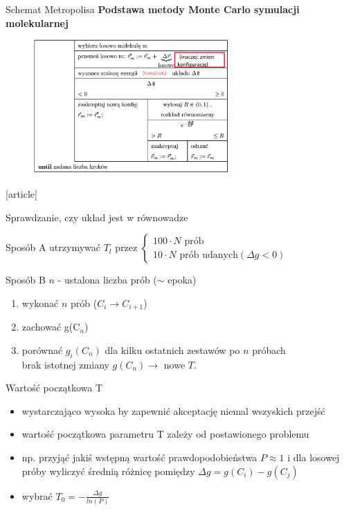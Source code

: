 	\begin{frame}{Schemat Metropolisa}
		\textbf{Podstawa metody Monte Carlo symulacji molekularnej}
		\begin{figure}
			\includegraphics[width=0.67\textwidth]{img/18/metropolis1}
		\end{figure}
		\begin{thebibliography}{9}
		\end{thebibliography}
	\end{frame}
		\begin{frame}{Sprawdzanie, czy układ jest w równowadze}
		\begin{block}{Sposób A}
			utrzymywać $T_l$ przez $\begin{cases}
			100 \cdot N \text{ prób} \\
			10 \cdot N \text{ prób udanych} (\Delta g < 0)
			\end{cases}$
		\end{block}
		
		\begin{block}{Sposób B}
		$n$ - ustalona liczba prób ($\sim$ epoka)
		\begin{enumerate}
			\item wykonać $n$ prób ($C_i \rightarrow C_{i+1}$)
			\item zachować g(C$_n$)
			\item porównać $g_i(C_n)$ dla kilku ostatnich zestawów po $n$ próbach \\
			brak istotnej zmiany $g(C_n) \rightarrow$ nowe $T$.
		\end{enumerate}
		\end{block}
\end{frame}
\begin{frame}{Wartość początkowa T}
\begin{itemize}
    \item wystarczająco wysoka by zapewnić akceptację niemal wszyskich przejść
    \item wartość początkowa parametru T zależy od postawionego problemu
    \item np. przyjąć jakiś wstępną wartość prawdopodobieństwa $P\approx 1$  i dla losowej próby wyliczyć średnią różnicę pomiędzy
    $\Delta g=g(C_i)-g(C_j)$
    \item wybrać $T_0=-\frac{\Delta g}{ln(P)}$
\end{itemize}
		   
			
		
		
\end{frame}
